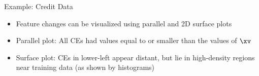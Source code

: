 \documentclass[11pt,compress,t,notes=noshow, aspectratio=169, xcolor=table]{beamer}
\begin{document}
\begin{frame}{Example: Credit Data }
\begin{itemize}
	\item<1-> Feature changes can be visualized using parallel and 2D surface plots
		\item<1-> Parallel plot: All CEs had values equal to or smaller than the values of $\xv$
		\item<2-> Surface plot: CEs in lower-left appear distant, but lie in high-density regions near training data (as shown by histograms)
	\end{itemize}
	\begin{columns}[totalwidth=\textwidth]
\end{columns}
\end{frame}
\end{document}
